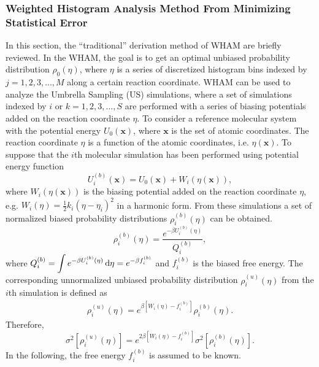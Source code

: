 \subsubsection{Weighted Histogram Analysis Method From Minimizing Statistical Error}
In this section, the ``traditional'' derivation method of WHAM are briefly reviewed.\cite{SouailleCPC2001} In the WHAM, the goal is to get an optimal unbiased probability distribution $\rho_{0}(\eta)$, where $\eta$ is a series of discretized histogram bins indexed by $j=1,2,3,...,M$ along a certain reaction coordinate. WHAM can be used to analyze the Umbrella Sampling (US) simulations, where a set of simulations indexed by $i$ or $k=1,2,3,...,S$ are performed with a series of biasing potentials added on the reaction coordinate $\eta$. To consider a reference molecular system with the potential energy $U_{0}(\textbf{x})$, where $\textbf{x}$ is the set of atomic coordinates. The reaction coordinate $\eta$ is a function of the atomic coordinates, i.e. $\eta(\textbf{x})$. To suppose that the $i$th molecular simulation has been performed using potential energy function
\begin{equation}
U_{i}^{(b)}(\textbf{x}) = U_{0}(\textbf{x}) + W_{i}(\eta(\textbf{x})),
\label{Eq:FEM:WHAM:biasmd}
\end{equation}
where $W_{i}(\eta(\textbf{x}))$ is the biasing potential added on the reaction coordinate $\eta$, e.g. $W_{i}(\eta)=\frac{1}{2}k_{i}(\eta-\eta_{i})^2$ in a harmonic form. From these simulations a set of normalized biased probability distributions ${\rho_{i}^{(b)}(\eta)}$ can be obtained.
\begin{equation}
\rho_{i}^{(b)}(\eta) = \frac{e^{-\beta U_{i}^{(b)}(\eta)}}{Q_{i}^{(b)}},
\label{Eq:FEM:WHAM:bias}
\end{equation}
where $Q_{i}^{(b)}=\displaystyle\int e^{-\beta U_{i}^{(b)}(\eta)} \mathop{}\!\mathrm{d}\eta = e^{-\beta f_{i}^{(b)}}$ and $f_{i}^{(b)}$ is the biased free energy.
The corresponding unnormalized unbiased probability distribution $\rho_{i}^{(u)}(\eta)$ from the $i$th simulation is defined as
\begin{align}
\rho_{i}^{(u)}(\eta) = e^{\beta[W_{i}(\eta)-f_{i}^{(b)}]}\rho_{i}^{(b)}(\eta).
\label{Eq:FEM:WHAM:unbias}
\end{align}
Therefore,
\begin{equation}
	\sigma^2\left[\rho_{i}^{(u)}(\eta)\right] = e^{2\beta[W_{i}(\eta)-f_{i}^{(b)}]}\sigma^2\left[\rho_{i}^{(b)}(\eta)\right].
	\label{Eq:FEM:WHAM:unbias_var2}
\end{equation}
In the following, the free energy $f_{i}^{(b)}$ is assumed to be known. 
